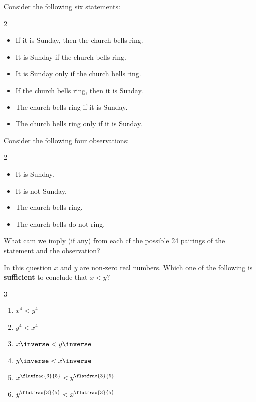 \documentclass{article}
\begin{document}
\begin{example}
    Consider the following six statements:
    \begin{multicols}{2}
        \begin{itemize}
            \item If it is Sunday, then the church bells ring.
            \item It is Sunday if the church bells ring.
            \item It is Sunday only if the church bells ring.
            \item If the church bells ring, then it is Sunday.
            \item The church bells ring if it is Sunday.
            \item The church bells ring only if it is Sunday.
        \end{itemize} 
    \end{multicols}

    Consider the following four observations:
    \begin{multicols}{2}
        \begin{itemize}
            \item It is Sunday.
            \item It is not Sunday.
            \item The church bells ring.
            \item The church bells do not ring.
        \end{itemize}
    \end{multicols}
    

    What cam we imply (if any) from each of the possible 24 pairings of the statement and the observation?
\end{example}

\begin{example}[TMUA 2016 P2 Q10]
    In this question \(x\) and \(y\) are non-zero real numbers. Which one of the following is \textbf{sufficient} to conclude that \(x < y\)?
    
    \begin{multicols}{3}
        \begin{enumerate}[label=\Alph*.]
            \item \(x^4 < y^4\)
            \item \(y^4 < x^4\)
            \item \(x\inverse < y\inverse\)
            \item \(y\inverse < x\inverse\)
            \item \(x^{\flatfrac{3}{5}} < y^{\flatfrac{3}{5}}\)
            \item \(y^{\flatfrac{3}{5}} < x^{\flatfrac{3}{5}}\)
        \end{enumerate}
    \end{multicols}
\end{example}
\end{document}

